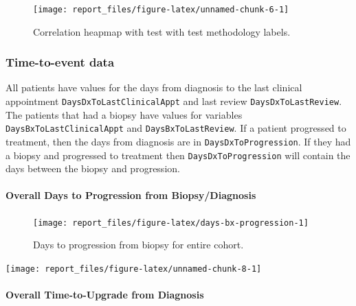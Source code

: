 \documentclass[]{article}
\begin{document}
\begin{figure}

{\centering \texttt{[image: report\_files/figure-latex/unnamed-chunk-6-1]} 

}

\caption{Correlation heapmap with test with test methodology labels.}\label{fig:unnamed-chunk-6}
\end{figure}

\hypertarget{time-to-event-data}{%
\subsubsection{Time-to-event data}\label{time-to-event-data}}

All patients have values for the days from diagnosis to the last clinical appointment \texttt{DaysDxToLastClinicalAppt} and last review \texttt{DaysDxToLastReview}.
The patients that had a biopsy have values for variables \texttt{DaysBxToLastClinicalAppt} and \texttt{DaysBxToLastReview}.
If a patient progressed to treatment, then the days from diagnosis are in \texttt{DaysDxToProgression}.
If they had a biopsy and progressed to treatment then \texttt{DaysDxToProgression} will contain the days between the biopsy and progression.

\hypertarget{overall-days-to-progression-from-biopsydiagnosis}{%
\paragraph{Overall Days to Progression from Biopsy/Diagnosis}\label{overall-days-to-progression-from-biopsydiagnosis}}

\begin{figure}

{\centering \texttt{[image: report\_files/figure-latex/days-bx-progression-1]} 

}

\caption{Days to progression from biopsy for entire cohort.}\label{fig:days-bx-progression}
\end{figure}

\begin{center}\texttt{[image: report\_files/figure-latex/unnamed-chunk-8-1]} \end{center}

\hypertarget{overall-time-to-upgrade-from-diagnosis}{%
\paragraph{Overall Time-to-Upgrade from Diagnosis}\label{overall-time-to-upgrade-from-diagnosis}}
\end{document}
